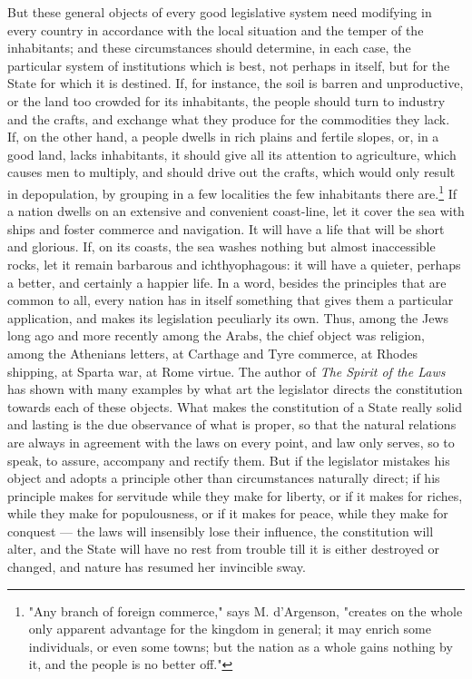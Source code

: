 \documentclass[12pt]{book}
\begin{document}
But these general objects of every good legislative system need modifying in every country in accordance with the local situation and the temper of the inhabitants; and these circumstances should determine, in each case, the particular system of institutions which is best, not perhaps in itself, but for the State for which it is destined. If, for instance, the soil is barren and unproductive, or the land too crowded for its inhabitants, the people should turn to industry and the crafts, and exchange what they produce for the commodities they lack. If, on the other hand, a people dwells in rich plains and fertile slopes, or, in a good land, lacks inhabitants, it should give all its attention to agriculture, which causes men to multiply, and should drive out the crafts, which would only result in depopulation, by grouping in a few localities the few inhabitants there are.\footnote{"Any branch of foreign commerce," says M. d'Argenson, "creates on the whole only apparent advantage for the kingdom in general; it may enrich some individuals, or even some towns; but the nation as a whole gains nothing by it, and the people is no better off."} If a nation dwells on an extensive and convenient coast-line, let it cover the sea with ships and foster commerce and navigation. It will have a life that will be short and glorious. If, on its coasts, the sea washes nothing but almost inaccessible rocks, let it remain barbarous and ichthyophagous: it will have a quieter, perhaps a better, and certainly a happier life. In a word, besides the principles that are common to all, every nation has in itself something that gives them a particular application, and makes its legislation peculiarly its own. Thus, among the Jews long ago and more recently among the Arabs, the chief object was religion, among the Athenians letters, at Carthage and Tyre commerce, at Rhodes shipping, at Sparta war, at Rome virtue. The author of \textit{The Spirit of the Laws} has shown with many examples by what art the legislator directs the constitution towards each of these objects. What makes the constitution of a State really solid and lasting is the due observance of what is proper, so that the natural relations are always in agreement with the laws on every point, and law only serves, so to speak, to assure, accompany and rectify them. But if the legislator mistakes his object and adopts a principle other than circumstances naturally direct; if his principle makes for servitude while they make for liberty, or if it makes for riches, while they make for populousness, or if it makes for peace, while they make for conquest — the laws will insensibly lose their influence, the constitution will alter, and the State will have no rest from trouble till it is either destroyed or changed, and nature has resumed her invincible sway.
\end{document}

